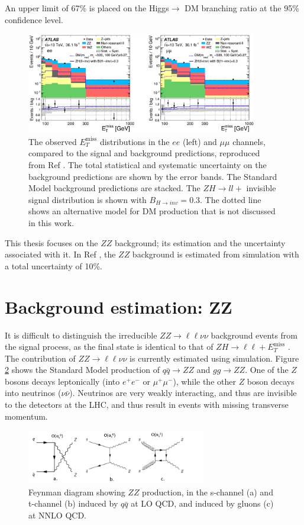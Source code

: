 \documentclass[11pt,a4paper,openright,twoside]{report}
\newcommand{\ZZ}{$ZZ\to \ell\ell\nu\nu$ }
\newcommand{\met}{$E_T^{\mathrm{miss}}$ }
\begin{document}
An upper limit of 67\% is placed on the Higgs$\to$ DM branching ratio at the 95\% confidence level.
\begin{figure}[h]
\centering
		\includegraphics[width=0.9\textwidth]{ZH_results.png}
		\caption{The observed \met distributions in the $ee$ (left) and $\mu\mu$ channels, compared to the signal and background predictions, reproduced from Ref \cite{ZH_ATLAS}. The total statistical and systematic uncertainty on the background predictions are shown by the error bands. The Standard Model background predictions are stacked. The $ZH\to ll+$ invisible signal distribution is shown with $B_{H\to inv}=0.3$. The dotted line shows an alternative model for DM production that is not discussed in this work.}
		\label{fig:ZH_results}
\end{figure}

This thesis focuses on the $ZZ$ background; its estimation and the uncertainty associated with it. In Ref \cite{ZH_ATLAS}, the $ZZ$ background is estimated from simulation with a total uncertainty of 10\%.



\section{Background estimation: ZZ}
It is difficult to distinguish the irreducible \ZZ background events from the signal process, as the final state is identical to that of $ZH\to \ell\ell+$\met. The contribution of \ZZ is currently estimated using simulation. Figure \ref{fig:ZZ} shows the Standard Model production of $q\bar{q}\to ZZ$ and $gg\to ZZ$. One of the $Z$ bosons decays leptonically (into $e^+e^-$ or $\mu^+\mu^-$), while the other $Z$ boson decays into neutrinos ($\nu\bar{\nu}$). Neutrinos are very weakly interacting, and thus are invisible to the detectors at the LHC, and thus result in events with missing transverse momentum.

\begin{figure}[H]
\centering
		\includegraphics[width=0.7\textwidth]{ZZ.png}
		\caption{Feynman diagram showing $ZZ$ production, in the s-channel (a) and t-channel (b) induced by $q\bar{q}$ at LO QCD, and induced by gluons (c) at NNLO QCD.}
		\label{fig:ZZ}
\end{figure}
\end{document}
